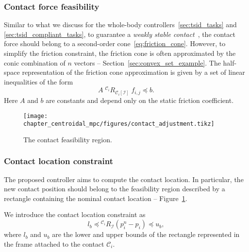 \subsubsection{Contact force feasibility}
Similar to what we discuss for the whole-body controllers~\ref{sec:tsid_tasks} and \ref{sec:tsid_compliant_tasks}, to guarantee a \emph{weakly stable contact}~\citep{Caron2015StabilityAreas}, the contact force should belong to a second-order cone~\eqref{eq:friction_cone}. However, to simplify the friction constraint, the friction cone is often approximated by the conic combination of $n$ vectors -- Section~\ref{sec:convex_set_example}. The half-space representation of the friction cone approximation is given by a set of linear inequalities of the form 
\begin{equation}
A \; {}^{\mathcal{C} _ {i} } R _{\mathcal{C} _ {i}[\mathcal{I}]} \; f _ {i, j} \preceq b.
\end{equation}
Here $A$ and $b$ are constants and depend only on the static friction coefficient. 
\begin{figure}[t]
    \centering
    \texttt{[image: chapter\_centroidal\_mpc/figures/contact\_adjustment.tikz]}
    \caption{The contact feasibility region.}
    \label{fig:contact_adjustment}
\end{figure}

\subsubsection{Contact location constraint}
The proposed controller aims to compute the contact location. In particular, the new contact position should belong to the feasibility region described by a rectangle containing the nominal contact location -- Figure~\ref{fig:contact_adjustment}.

We introduce the contact location constraint as 
\begin{equation}
    l_b\preceq {}^{\mathcal{C} _ {i} }  R_{\mathcal{I}}   (p_{i}^n - p_{i}) \preceq u_b,
\end{equation}
where $l_b$ and $u_b$ are the lower and upper bounds of the rectangle represented in the frame attached to the contact $\mathcal{C} _ {i} $.


